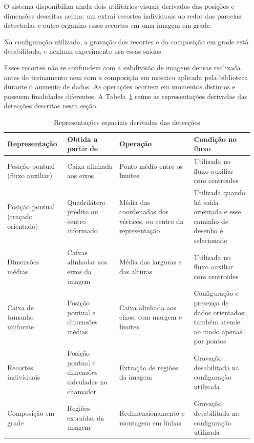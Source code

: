 O sistema disponibiliza ainda dois utilit\'arios visuais derivados das posi\c{c}\~oes e dimens\~oes descritas acima: um extrai recortes individuais ao redor das parcelas detectadas e outro organiza esses recortes em uma imagem em grade.

Na configura\c{c}\~ao utilizada, a grava\c{c}\~ao dos recortes e da composi\c{c}\~ao em grade est\'a desabilitada, e nenhum experimento usa essas sa\'idas.

Esses recortes n\~ao se confundem com a subdivis\~ao de imagens densas realizada antes do treinamento nem com a composi\c{c}\~ao em mosaico aplicada pela biblioteca durante o aumento de dados. As opera\c{c}\~oes ocorrem em momentos distintos e possuem finalidades diferentes. A Tabela~\ref{tab:representacoes-espaciais} re\'une as representa\c{c}\~oes derivadas das detec\c{c}\~oes descritas nesta se\c{c}\~ao.

\begin{table}[htb]
\centering
\caption{Representa\c{c}\~oes espaciais derivadas das detec\c{c}\~oes}
\label{tab:representacoes-espaciais}
\small
\begin{tabular}{p{3cm}p{3.3cm}p{3.7cm}p{4.5cm}}
\hline
\textbf{Representa\c{c}\~ao} & \textbf{Obtida a partir de} & \textbf{Opera\c{c}\~ao} & \textbf{Condi\c{c}\~ao no fluxo} \\
\hline
Posi\c{c}\~ao pontual (fluxo auxiliar) & Caixa alinhada aos eixos & Ponto m\'edio entre os limites & Utilizada no fluxo auxiliar com centroides \\
Posi\c{c}\~ao pontual (tra\c{c}ado orientado) & Quadril\'atero predito ou centro informado & M\'edia das coordenadas dos v\'ertices, ou centro da representa\c{c}\~ao & Utilizada quando h\'a sa\'ida orientada e esse caminho de desenho \'e selecionado \\
Dimens\~oes m\'edias & Caixas alinhadas aos eixos da imagem & M\'edia das larguras e das alturas & Utilizada no fluxo auxiliar com centroides \\
Caixa de tamanho uniforme & Posi\c{c}\~ao pontual e dimens\~oes m\'edias & Caixa alinhada aos eixos, com margem e limites & Configura\c{c}\~ao e presen\c{c}a de dados orientados; tamb\'em atende ao modo apenas por pontos \\
Recortes individuais & Posi\c{c}\~ao pontual e dimens\~oes calculadas no chamador & Extra\c{c}\~ao de regi\~oes da imagem & Grava\c{c}\~ao desabilitada na configura\c{c}\~ao utilizada \\
Composi\c{c}\~ao em grade & Regi\~oes extra\'idas da imagem & Redimensionamento e montagem em linhas & Grava\c{c}\~ao desabilitada na configura\c{c}\~ao utilizada \\
\hline
\end{tabular}
\end{table}

